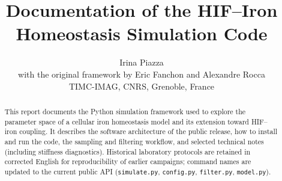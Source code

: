 \documentclass[11pt,a4paper,oneside]{report}
\title{Documentation of the HIF--Iron Homeostasis Simulation Code}
\author{Irina Piazza\\
  with the original framework by Eric Fanchon and Alexandre Rocca\\[1em]
  \normalsize TIMC-IMAG, CNRS, Grenoble, France}
\date{}
\begin{document}
\maketitle

\begin{abstract}
This report documents the Python simulation framework used to explore the
parameter space of a cellular iron homeostasis model and its extension toward
HIF--iron coupling. It describes the software architecture of the public
release, how to install and run the code, the sampling and filtering workflow,
and selected technical notes (including stiffness diagnostics). Historical
laboratory protocols are retained in corrected English for reproducibility of
earlier campaigns; command names are updated to the current public API
(\texttt{simulate.py}, \texttt{config.py}, \texttt{filter.py}, \texttt{model.py}).
\end{abstract}

\tableofcontents
\newpage





\end{document}
